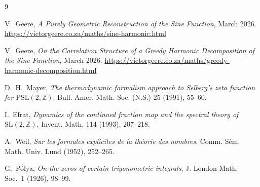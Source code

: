 \documentclass[11pt,a4paper]{article}
\theoremstyle{remark}
\begin{document}
\begin{thebibliography}{9}

V.~Geere, \emph{A Purely Geometric Reconstruction of the Sine Function},
March 2026. \url{https://victorgeere.co.za/maths/sine-harmonic.html}

V.~Geere, \emph{On the Correlation Structure of a Greedy Harmonic Decomposition of the Sine Function},
March 2026. \url{https://victorgeere.co.za/maths/greedy-harmonic-decomposition.html}

D.~H.~Mayer, \emph{The thermodynamic formalism approach to Selberg's zeta function for \(\mathrm{PSL}(2,\mathbb{Z})\)}, Bull. Amer. Math. Soc. (N.S.) 25 (1991), 55--60.

I.~Efrat, \emph{Dynamics of the continued fraction map and the spectral theory of \(\mathrm{SL}(2,\mathbb{Z})\)}, Invent. Math. 114 (1993), 207--218.

A.~Weil, \emph{Sur les formules explicites de la th\'eorie des nombres}, Comm. S\'em. Math. Univ. Lund (1952), 252--265.

G.~P\'olya, \emph{On the zeros of certain trigonometric integrals}, J. London Math. Soc.~1 (1926), 98--99.

\end{thebibliography}
\end{document}

